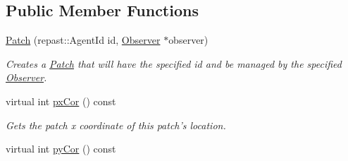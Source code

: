 \subsection*{Public Member Functions}
\begin{DoxyCompactItemize}
\item 
\hyperlink{classrepast_1_1relogo_1_1_patch_aa866832379645e38ccd420e91c0fe7d0}{Patch} (repast\-::\-Agent\-Id id, \hyperlink{classrepast_1_1relogo_1_1_observer}{Observer} $\ast$observer)
\begin{DoxyCompactList}\small\item\em Creates a \hyperlink{classrepast_1_1relogo_1_1_patch}{Patch} that will have the specified id and be managed by the specified \hyperlink{classrepast_1_1relogo_1_1_observer}{Observer}. \end{DoxyCompactList}\item 
\hypertarget{classrepast_1_1relogo_1_1_patch_a410a47c2b1dc260d83c65ffb66b33a75}{virtual int \hyperlink{classrepast_1_1relogo_1_1_patch_a410a47c2b1dc260d83c65ffb66b33a75}{px\-Cor} () const }\label{classrepast_1_1relogo_1_1_patch_a410a47c2b1dc260d83c65ffb66b33a75}

\begin{DoxyCompactList}\small\item\em Gets the patch x coordinate of this patch's location. \end{DoxyCompactList}\item 
\hypertarget{classrepast_1_1relogo_1_1_patch_a9fe953832fa384a6fa19bd32511954fc}{virtual int \hyperlink{classrepast_1_1relogo_1_1_patch_a9fe953832fa384a6fa19bd32511954fc}{py\-Cor} () const }\label{classrepast_1_1relogo_1_1_patch_a9fe953832fa384a6fa19bd32511954fc}


\end{DoxyCompactItemize}
